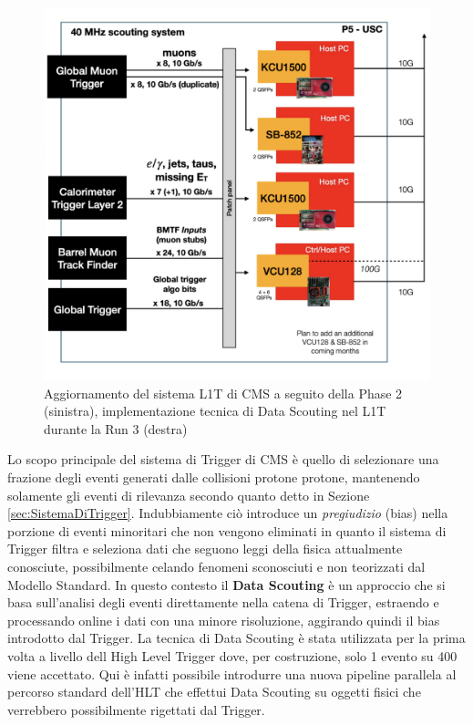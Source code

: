 \begin{figure}[t]
\begin{minipage}[b]{0.48\textwidth}
      \includegraphics[width=\textwidth]{../ImmaginiTesi/DataScoutingRun3.png} 
  \end{minipage}
  \caption{Aggiornamento del sistema L1T di CMS a seguito della Phase 2 (sinistra), implementazione tecnica di Data Scouting nel L1T durante la Run 3 (destra)}
  \label{fig:Scouting}
\end{figure}

Lo scopo principale del sistema di Trigger di CMS è quello di selezionare una frazione degli eventi generati dalle collisioni protone protone, mantenendo solamente gli eventi di rilevanza secondo quanto detto in Sezione \ref{sec:SistemaDiTrigger}. Indubbiamente ciò introduce un \textit{pregiudizio} (bias) nella porzione di eventi minoritari che non vengono eliminati in quanto il sistema di Trigger filtra e seleziona dati che seguono leggi della fisica attualmente conosciute, possibilmente celando fenomeni sconosciuti e non teorizzati dal Modello Standard. \newline
In questo contesto il \textbf{Data Scouting} è un approccio che si basa sull'analisi degli eventi direttamente nella catena di Trigger, estraendo e processando online i dati con una minore risoluzione, aggirando quindi il bias introdotto dal Trigger. \newline
La tecnica di Data Scouting è stata utilizzata per la prima volta a livello dell High Level Trigger dove, per costruzione, solo 1 evento su 400 viene accettato. Qui è infatti possibile introdurre una nuova pipeline parallela al percorso standard dell'HLT che effettui Data Scouting su oggetti fisici che verrebbero possibilmente rigettati dal Trigger.

